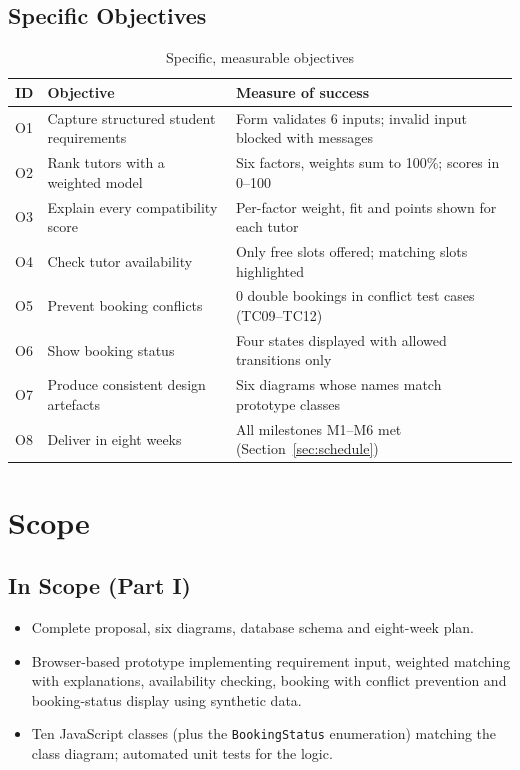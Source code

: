 \documentclass[11pt,a4paper]{article}
\begin{document}
\subsection{Specific Objectives}
\begin{table}[H]
\centering
\caption{Specific, measurable objectives}
\begin{tabularx}{\linewidth}{@{}l X X@{}}
\toprule
\textbf{ID} & \textbf{Objective} & \textbf{Measure of success}\\ \midrule
O1 & Capture structured student requirements & Form validates 6 inputs; invalid input blocked with messages\\
O2 & Rank tutors with a weighted model & Six factors, weights sum to 100\%; scores in 0--100\\
O3 & Explain every compatibility score & Per-factor weight, fit and points shown for each tutor\\
O4 & Check tutor availability & Only free slots offered; matching slots highlighted\\
O5 & Prevent booking conflicts & 0 double bookings in conflict test cases (TC09--TC12)\\
O6 & Show booking status & Four states displayed with allowed transitions only\\
O7 & Produce consistent design artefacts & Six diagrams whose names match prototype classes\\
O8 & Deliver in eight weeks & All milestones M1--M6 met (Section~\ref{sec:schedule})\\
\bottomrule
\end{tabularx}
\end{table}

\section{Scope}
\subsection{In Scope (Part I)}
\begin{itemize}
  \item Complete proposal, six diagrams, database schema and eight-week plan.
  \item Browser-based prototype implementing requirement input, weighted matching with explanations, availability checking, booking with conflict prevention and booking-status display using synthetic data.
  \item Ten JavaScript classes (plus the \texttt{BookingStatus} enumeration) matching the class diagram; automated unit tests for the logic.
\end{itemize}
\end{document}
